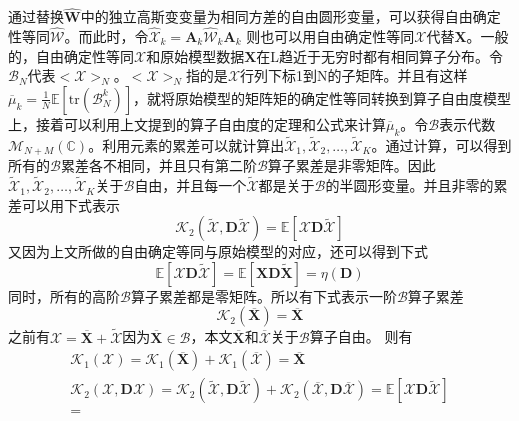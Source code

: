 \documentclass[bachelor,nocolorlinks, printoneside]{seuthesis} %
\begin{document}
\begin{Main}
通过替换$\hat{\mathbf{W}}$中的独立高斯变变量为相同方差的自由圆形变量，可以获得自由确定性等同$\hat{\mathcal{W}}$。而此时，令$\hat{\mathcal{X}}_k = \mathbf{A}_k \hat{\mathcal{W}}_k \mathbf{A}_k$ 则也可以用自由确定性等同$\mathcal{X}$代替$\mathbf{X}$。一般的，自由确定性等同$\mathcal{X}$和原始模型数据$\mathbf{X}$在L趋近于无穷时都有相同算子分布。令$\mathcal{B}_N$代表$<\mathcal{X}>_N$。$<\mathcal{X}>_N$指的是$\mathcal{X}$行列下标1到N的子矩阵。并且有这样$\overline{\mu}_k = \frac{1}{N}\mathbb{E}[\mathrm{tr}(\mathcal{B}_N^k)]$，就将原始模型的矩阵矩的确定性等同转换到算子自由度模型上，接着可以利用上文提到的算子自由度的定理和公式来计算$\overline{\mu}_k$。令$\mathcal{B}$表示代数$\mathcal{M}_{N+M}(\mathbb{C})$。利用元素的累差可以就计算出$\tilde{\mathcal{X}}_1,\tilde{\mathcal{X}}_2,\ldots,\tilde{\mathcal{X}}_K$。通过计算，可以得到所有的$\mathcal{B}$累差各不相同，并且只有第二阶$\mathcal{B}$算子累差是非零矩阵。因此$\tilde{\mathcal{X}}_1,\tilde{\mathcal{X}}_2,\ldots,\tilde{\mathcal{X}}_K$关于$\mathcal{B}$自由，并且每一个$\tilde{\mathcal{X}}$都是关于$\mathcal{B}$的半圆形变量。并且非零的累差可以用下式表示
\begin{equation}\label{key}
\mathcal{K}_2(\tilde{\mathcal{X}},\mathbf{D}\tilde{\mathcal{X}})=\mathbb{E}[\mathcal{X}\mathbf{D}\tilde{\mathcal{X}}]
\end{equation}
又因为上文所做的自由确定等同与原始模型的对应，还可以得到下式
\begin{equation}\label{key}
\mathbb{E}[\mathcal{X}\mathbf{D}\tilde{\mathcal{X}}]=
\mathbb{E}[\mathbf{X}\mathbf{D}\tilde{\mathbf{X}}] = \eta(\mathbf{D})
\end{equation}
同时，所有的高阶$\mathcal{B}$算子累差都是零矩阵。所以有下式表示一阶$\mathcal{B}$算子累差
\begin{equation}\label{key}
\mathcal{K}_2(\overline{\mathbf{X}}) = \overline{\mathbf{X}}
\end{equation}
之前有$\mathcal{X}=\overline{\mathbf{X}}+\tilde{\mathcal{X}}$因为$\overline{\mathbf{X}}\in \mathcal{B}$，本文$\overline{\mathbf{X}}$和$\overline{\mathcal{X}}$关于$\mathcal{B}$算子自由。
则有
\begin{eqnarray}\label{key}
\mathcal{K}_1(\mathcal{X}) = \mathcal{K}_1(\overline{\mathbf{X}}) + \mathcal{K}_1(\overline{\mathcal{X}}) = \overline{\mathbf{X}} \nonumber\\
\mathcal{K}_2({\mathcal{X}},\mathbf{D}{\mathcal{X}})=\mathcal{K}_2(\tilde{\mathcal{X}},\mathbf{D}\tilde{\mathcal{X}}) + \mathcal{K}_2(\overline{\mathcal{X}},\mathbf{D}\overline{\mathcal{X}}) =\mathbb{E}[\mathcal{X}\mathbf{D}\tilde{\mathcal{X}}]\nonumber \\= 

\end{eqnarray}
\end{Main}
\end{document}
